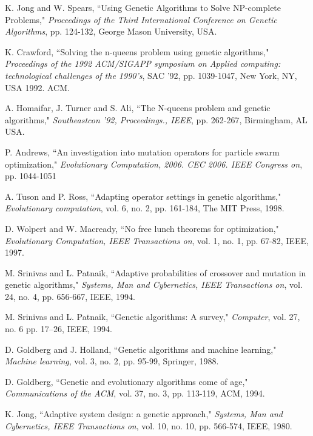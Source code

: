 \documentclass[conference]{IEEEtran}
\begin{document}
\begin{thebibliography}{17}

 K. Jong and W. Spears, ``Using Genetic Algorithms to Solve NP-complete Problems,"
        {\it Proceedings of the Third International Conference on Genetic Algorithms}, pp. 124-132, George Mason University, USA.

 K. Crawford, ``Solving the n-queens problem using genetic algorithms,"
        {\it Proceedings of the 1992 ACM/SIGAPP symposium on Applied computing: technological challenges of the 1990's}, SAC '92, pp. 1039-1047, New York, NY, USA 1992. ACM.

 A. Homaifar, J. Turner and S. Ali, ``The N-queens problem and genetic algorithms," 
        {\it Southeastcon '92, Proceedings., IEEE}, pp. 262-267, Birmingham, AL USA.

 P. Andrews, ``An investigation into mutation operators for particle swarm optimization,"
        {\it Evolutionary Computation, 2006. CEC 2006. IEEE Congress on}, pp. 1044-1051

 A. Tuson and P. Ross, ``Adapting operator settings in genetic algorithms,"
        {\it Evolutionary computation}, vol. 6, no. 2, pp. 161-184, The MIT Press, 1998.

 D. Wolpert and W. Macready, ``No free lunch theorems for optimization,"
        {\it Evolutionary Computation, IEEE Transactions on}, vol. 1, no. 1, pp. 67-82, IEEE, 1997.

 M. Srinivas and L. Patnaik, ``Adaptive probabilities of crossover and mutation in genetic algorithms,"
        {\it Systems, Man and Cybernetics, IEEE Transactions on}, vol. 24, no. 4, pp. 656-667, IEEE, 1994.

 M. Srinivas and L. Patnaik, ``Genetic algorithms: A survey,"
        {\it Computer}, vol. 27, no. 6 pp. 17--26, IEEE, 1994.

 D. Goldberg and J. Holland, ``Genetic algorithms and machine learning,"
        {\it Machine learning}, vol. 3, no. 2, pp. 95-99, Springer, 1988.

 D. Goldberg, ``Genetic and evolutionary algorithms come of age,"
        {\it Communications of the ACM}, vol. 37, no. 3, pp. 113-119, ACM, 1994.

 K. Jong, ``Adaptive system design: a genetic approach,"
        {\it Systems, Man and Cybernetics, IEEE Transactions on}, vol. 10, no. 10, pp. 566-574, IEEE, 1980.


\end{thebibliography}
\end{document}

